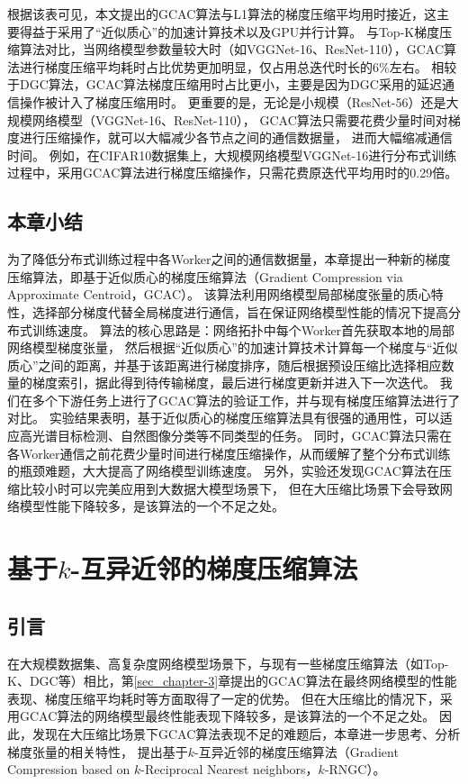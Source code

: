 \documentclass{xdupgthesis}
\begin{document}
根据该表可见，本文提出的GCAC算法与L1算法的梯度压缩平均用时接近，这主要得益于采用了“近似质心”的加速计算技术以及GPU并行计算。
与Top-K梯度压缩算法对比，当网络模型参数量较大时（如VGGNet-16、ResNet-110），GCAC算法进行梯度压缩平均耗时占比优势更加明显，仅占用总迭代时长的$6\%$左右。
相较于DGC算法，GCAC算法梯度压缩用时占比更小，主要是因为DGC采用的延迟通信操作被计入了梯度压缩用时。
更重要的是，无论是小规模（ResNet-56）还是大规模网络模型（VGGNet-16、ResNet-110），
GCAC算法只需要花费少量时间对梯度进行压缩操作，就可以大幅减少各节点之间的通信数据量，
进而大幅缩减通信时间。
例如，在CIFAR10数据集上，大规模网络模型VGGNet-16进行分布式训练过程中，采用GCAC算法进行梯度压缩操作，只需花费原迭代平均用时的0.29倍。


\section{本章小结}
\label{sec_Summary-3}
为了降低分布式训练过程中各Worker之间的通信数据量，本章提出一种新的梯度压缩算法，即基于近似质心的梯度压缩算法（Gradient Compression via Approximate Centroid，GCAC）。
该算法利用网络模型局部梯度张量的质心特性，选择部分梯度代替全局梯度进行通信，旨在保证网络模型性能的情况下提高分布式训练速度。
算法的核心思路是：网络拓扑中每个Worker首先获取本地的局部网络模型梯度张量，
然后根据“近似质心”的加速计算技术计算每一个梯度与“近似质心”之间的距离，并基于该距离进行梯度排序，随后根据预设压缩比选择相应数量的梯度索引，据此得到待传输梯度，最后进行梯度更新并进入下一次迭代。
我们在多个下游任务上进行了GCAC算法的验证工作，并与现有梯度压缩算法进行了对比。
实验结果表明，基于近似质心的梯度压缩算法具有很强的通用性，可以适应高光谱目标检测、自然图像分类等不同类型的任务。
同时，GCAC算法只需在各Worker通信之前花费少量时间进行梯度压缩操作，从而缓解了整个分布式训练的瓶颈难题，大大提高了网络模型训练速度。
另外，实验还发现GCAC算法在压缩比较小时可以完美应用到大数据大模型场景下，
但在大压缩比场景下会导致网络模型性能下降较多，是该算法的一个不足之处。



\chapter{基于\texorpdfstring{$k$}.-互异近邻的梯度压缩算法}
\section{引言}
在大规模数据集、高复杂度网络模型场景下，与现有一些梯度压缩算法（如Top-K、DGC等）相比，第\ref{sec_chapter-3}章提出的GCAC算法在最终网络模型的性能表现、梯度压缩平均耗时等方面取得了一定的优势。
但在大压缩比的情况下，采用GCAC算法的网络模型最终性能表现下降较多，是该算法的一个不足之处。
因此，发现在大压缩比场景下GCAC算法表现不足的难题后，本章进一步思考、分析梯度张量的相关特性，
提出基于$k$-互异近邻的梯度压缩算法（Gradient Compression based on $k$-Reciprocal Nearest neighbors，$k$-RNGC）。
\end{document}
